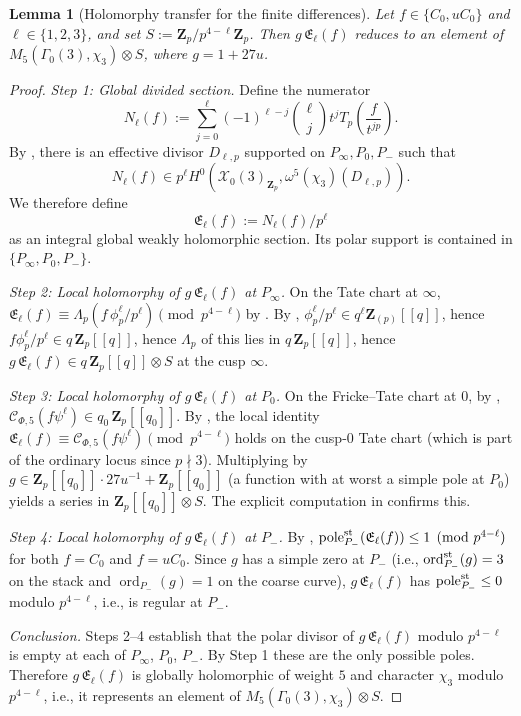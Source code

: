 \documentclass[11pt]{amsart}
\newtheorem{lemma}[theorem]{Lemma}
\theoremstyle{definition}
\theoremstyle{remark}
\newcommand{\Z}{\mathbf{Z}}
\newcommand{\ord}{\operatorname{ord}}
\begin{document}
\begin{lemma}[Holomorphy transfer for the finite differences]\label{lem:holomorphy-transfer}
Let $f\in\{C_0,uC_0\}$ and $\ell\in\{1,2,3\}$, and set $S:=\Z_p/p^{4-\ell}\Z_p$. Then $g\,\mathfrak E_\ell(f)$ reduces to an element of $M_5(\Gamma_0(3),\chi_3)\otimes S$, where $g=1+27u$.
\end{lemma}

\begin{proof}
\emph{Step 1: Global divided section.} Define the numerator
\[
N_\ell(f):=\sum_{j=0}^{\ell}(-1)^{\ell-j}\binom{\ell}{j}t^jT_p\!\left(\frac{f}{t^{jp}}\right).
\]
By , there is an effective divisor $D_{\ell,p}$ supported on $P_\infty,P_0,P_-$ such that
\[
N_\ell(f)\in p^\ell H^0(\mathcal X_0(3)_{\Z_p},\omega^5(\chi_3)(D_{\ell,p})).
\]
We therefore define
\[
\mathfrak E_\ell(f):=N_\ell(f)/p^\ell
\]
as an integral global weakly holomorphic section. Its polar support is contained in $\{P_\infty,P_0,P_-\}$.

\emph{Step 2: Local holomorphy of $g\,\mathfrak E_\ell(f)$ at $P_\infty$.} On the Tate chart at $\infty$, $\mathfrak E_\ell(f)\equiv\Lambda_p(f\,\phi_p^\ell/p^\ell)\pmod{p^{4-\ell}}$ by . By , $\phi_p^\ell/p^\ell\in q^\ell\Z_{(p)}[[q]]$, hence $f\phi_p^\ell/p^\ell\in q\,\Z_p[[q]]$, hence $\Lambda_p$ of this lies in $q\,\Z_p[[q]]$, hence $g\,\mathfrak E_\ell(f)\in q\,\Z_p[[q]]\otimes S$ at the cusp $\infty$.

\emph{Step 3: Local holomorphy of $g\,\mathfrak E_\ell(f)$ at $P_0$.} On the Fricke--Tate chart at $0$, by , $\mathcal C_{\Phi,5}(f\psi^\ell)\in q_0\,\Z_p[[q_0]]$. By , the local identity $\mathfrak E_\ell(f)\equiv\mathcal C_{\Phi,5}(f\psi^\ell)\pmod{p^{4-\ell}}$ holds on the cusp-$0$ Tate chart (which is part of the ordinary locus since $p\nmid 3$). Multiplying by $g\in\Z_p[[q_0]]\cdot 27u^{-1}+\Z_p[[q_0]]$ (a function with at worst a simple pole at $P_0$) yields a series in $\Z_p[[q_0]]\otimes S$. The explicit computation in  confirms this.

\emph{Step 4: Local holomorphy of $g\,\mathfrak E_\ell(f)$ at $P_-$.} By , $\operatorname{pole}^{\rm st}_{P_-}(\mathfrak E_\ell(f))\le 1\pmod{p^{4-\ell}}$ for both $f=C_0$ and $f=uC_0$. Since $g$ has a simple zero at $P_-$ (i.e., $\operatorname{ord}^{\rm st}_{P_-}(g)=3$ on the stack and $\ord_{P_-}(g)=1$ on the coarse curve), $g\,\mathfrak E_\ell(f)$ has $\operatorname{pole}^{\rm st}_{P_-}\le 0$ modulo $p^{4-\ell}$, i.e., is regular at $P_-$.

\emph{Conclusion.} Steps 2--4 establish that the polar divisor of $g\,\mathfrak E_\ell(f)$ modulo $p^{4-\ell}$ is empty at each of $P_\infty$, $P_0$, $P_-$. By Step 1 these are the only possible poles. Therefore $g\,\mathfrak E_\ell(f)$ is globally holomorphic of weight $5$ and character $\chi_3$ modulo $p^{4-\ell}$, i.e., it represents an element of $M_5(\Gamma_0(3),\chi_3)\otimes S$.
\end{proof}
\end{document}
